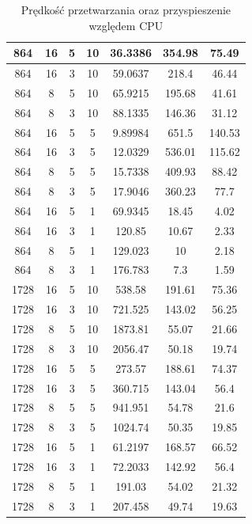 \documentclass[12pt,a4paper]{article}
\begin{document}
\begin{table}[H]
\begin{adjustbox}{totalheight=\textheight-\baselineskip}
\begin{tabular}{|c|c|c|c|c|c|c|}
864	&	16	&	5	&	10	&	36.3386	&	354.98	&	75.49	\\ \hline
864	&	16	&	3	&	10	&	59.0637	&	218.4	&	46.44	\\ \hline
864	&	8	&	5	&	10	&	65.9215	&	195.68	&	41.61	\\ \hline
864	&	8	&	3	&	10	&	88.1335	&	146.36	&	31.12	\\ \hline
864	&	16	&	5	&	5	&	9.89984	&	651.5	&	140.53	\\ \hline
864	&	16	&	3	&	5	&	12.0329	&	536.01	&	115.62	\\ \hline
864	&	8	&	5	&	5	&	15.7338	&	409.93	&	88.42	\\ \hline
864	&	8	&	3	&	5	&	17.9046	&	360.23	&	77.7	\\ \hline
864	&	16	&	5	&	1	&	69.9345	&	18.45	&	4.02	\\ \hline
864	&	16	&	3	&	1	&	120.85	&	10.67	&	2.33	\\ \hline
864	&	8	&	5	&	1	&	129.023	&	10	&	2.18	\\ \hline
864	&	8	&	3	&	1	&	176.783	&	7.3	&	1.59	\\ \hline
1728	&	16	&	5	&	10	&	538.58	&	191.61	&	75.36	\\ \hline
1728	&	16	&	3	&	10	&	721.525	&	143.02	&	56.25	\\ \hline
1728	&	8	&	5	&	10	&	1873.81	&	55.07	&	21.66	\\ \hline
1728	&	8	&	3	&	10	&	2056.47	&	50.18	&	19.74	\\ \hline
1728	&	16	&	5	&	5	&	273.57	&	188.61	&	74.37	\\ \hline
1728	&	16	&	3	&	5	&	360.715	&	143.04	&	56.4	\\ \hline
1728	&	8	&	5	&	5	&	941.951	&	54.78	&	21.6	\\ \hline
1728	&	8	&	3	&	5	&	1024.74	&	50.35	&	19.85	\\ \hline
1728	&	16	&	5	&	1	&	61.2197	&	168.57	&	66.52	\\ \hline
1728	&	16	&	3	&	1	&	72.2033	&	142.92	&	56.4	\\ \hline
1728	&	8	&	5	&	1	&	191.03	&	54.02	&	21.32	\\ \hline
1728	&	8	&	3	&	1	&	207.458	&	49.74	&	19.63	\\ \hline
\end{tabular}
\end{adjustbox}
\caption{Prędkość przetwarzania oraz przyspieszenie względem CPU}
\label{table:all}
\end{table}
\end{document}
